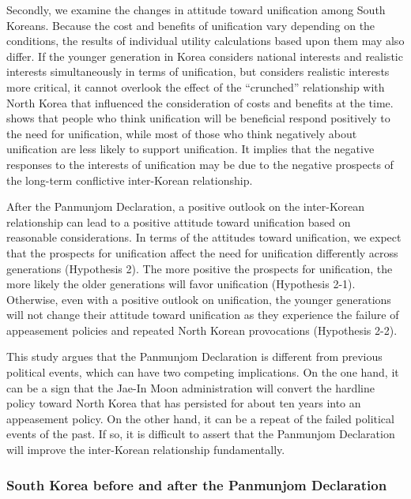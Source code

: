 \documentclass[letterpaper,9pt,twocolumn,twoside,]{pinp}
\begin{document}
Secondly, we examine the changes in attitude toward unification among
South Koreans. Because the cost and benefits of unification vary
depending on the conditions, the results of individual utility
calculations based upon them may also differ. If the younger generation
in Korea considers national interests and realistic interests
simultaneously in terms of unification, but considers realistic
interests more critical, it cannot overlook the effect of the
``crunched'' relationship with North Korea that influenced the
consideration of costs and benefits at the time. \citet{Choi2016} shows
that people who think unification will be beneficial respond positively
to the need for unification, while most of those who think negatively
about unification are less likely to support unification. It implies
that the negative responses to the interests of unification may be due
to the negative prospects of the long-term conflictive inter-Korean
relationship.

After the Panmunjom Declaration, a positive outlook on the inter-Korean
relationship can lead to a positive attitude toward unification based on
reasonable considerations. In terms of the attitudes toward unification,
we expect that the prospects for unification affect the need for
unification differently across generations (Hypothesis 2). The more
positive the prospects for unification, the more likely the older
generations will favor unification (Hypothesis 2-1). Otherwise, even
with a positive outlook on unification, the younger generations will not
change their attitude toward unification as they experience the failure
of appeasement policies and repeated North Korean provocations
(Hypothesis 2-2).

This study argues that the Panmunjom Declaration is different from
previous political events, which can have two competing implications. On
the one hand, it can be a sign that the Jae-In Moon administration will
convert the hardline policy toward North Korea that has persisted for
about ten years into an appeasement policy. On the other hand, it can be
a repeat of the failed political events of the past. If so, it is
difficult to assert that the Panmunjom Declaration will improve the
inter-Korean relationship fundamentally.

\hypertarget{south-korea-before-and-after-the-panmunjom-declaration}{%
\subsubsection{South Korea before and after the Panmunjom
Declaration}\label{south-korea-before-and-after-the-panmunjom-declaration}}
\end{document}
